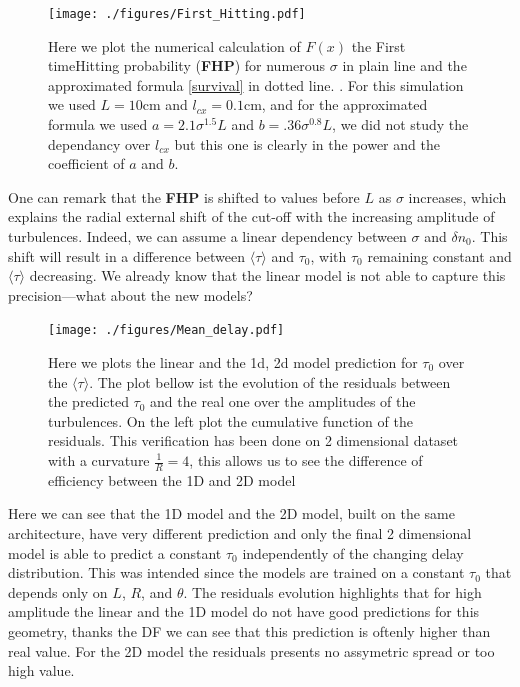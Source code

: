 \documentclass[11pt,a4paper,openany]{report}
\begin{document}
\begin{multicols}{2}
    \begin{figure}[H]
        \centering
        \hspace{-1.2cm}\texttt{[image: ./figures/First\_Hitting.pdf]}
        \label{fig:FHP}
        \caption{Here we plot the numerical calculation of $F(x)$ the First timeHitting probability (\textbf{FHP}) for numerous $\sigma$ in plain line  and the approximated formula \eqref{survival} in dotted line. . For this simulation we used $L = 10$cm and $l_{cx} = 0.1$cm, and for the approximated formula we used $a = 2.1 \sigma^{1.5}L$ and $b = .36\sigma^{0.8} L$, we did not study the dependancy over $l_{cx}$ but this one is clearly in the power and the coefficient of $a$ and $b$.}
    \end{figure}One can remark that the \textbf{FHP} is shifted to values before \( L \) as \( \sigma \) increases, which explains the radial external shift of the cut-off with the increasing amplitude of turbulences. Indeed, we can assume a linear dependency between \( \sigma \) and \( \delta n_0 \). This shift will result in a difference between \( \langle \tau \rangle \) and \( \tau_0 \), with \( \tau_0 \) remaining constant and \( \langle \tau \rangle \) decreasing. We already know that the linear model is not able to capture this precision—what about the new models?
    \begin{figure}[H]
        \centering
        \hspace*{-1.3cm}\texttt{[image: ./figures/Mean\_delay.pdf]}
        \caption{Here we plots the linear and the 1d, 2d model prediction for $\tau_0$ over the $\langle \tau \rangle$. The plot bellow ist the evolution of the residuals between the predicted $\tau_0$ and the real one over the amplitudes of the turbulences. On the left plot the cumulative function of the residuals. This verification has been done on 2 dimensional dataset with a curvature $\frac{1}{R} = 4$, this allows us to see the difference of efficiency between the 1D and 2D model}
        \label{fig:mean_delay}
    \end{figure}

    Here we can see that the 1D model and the 2D model, built on the same architecture, have very different prediction and only the final 2 dimensional model is able to predict a constant \(\tau_0\) independently of the changing delay distribution. This was intended since the models are trained on a constant \(\tau_0\) that depends only on \(L\), \(R\), and \(\theta\). The residuals evolution highlights that for high amplitude the linear and the 1D model do not have good predictions for this geometry, thanks the DF we can see that this prediction is oftenly higher than real value. For the 2D model the residuals presents no assymetric spread or too high value.


\end{multicols}
\end{document}
